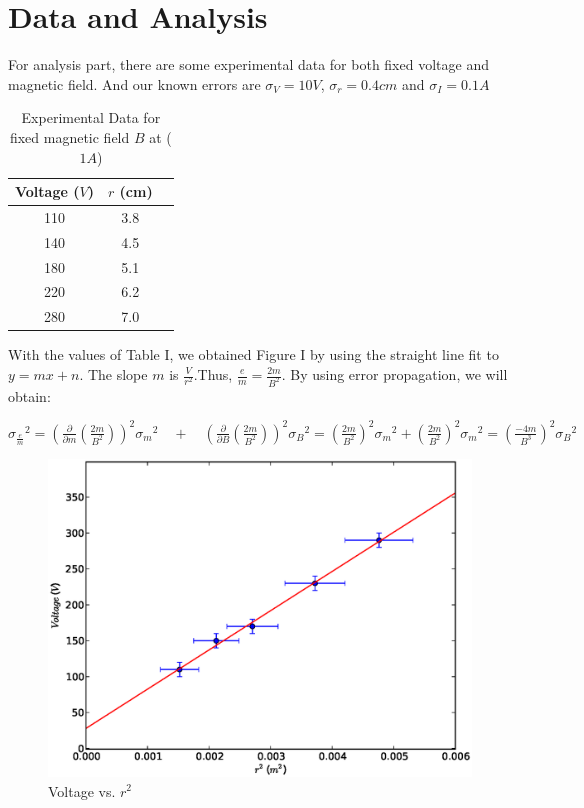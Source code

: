\documentclass[aps,nofootinbib,onecolumn,groupedaddress,a4paper]{revtex4}
\begin{document}
\section{Data and Analysis}
For analysis part, there are some experimental data for both fixed voltage and magnetic field. And our known errors are ${\sigma}_{V}=10V$,  ${\sigma}_{r}=0.4cm$ and ${\sigma}_{I}=0.1A$  
\begin{table}[htdp]
\caption{ Experimental Data for fixed magnetic field $B$ at ($1A$)}
\label{rawdata}
\centering
\begin{tabular}{ccc}
\\
Voltage ($V$)  & $r$ (cm)  \\
\hline
110 &  3.8   \\
140 &  4.5   \\
180 &  5.1   \\
220 &  6.2   \\
280 &  7.0   
\end{tabular}
\label{default}
\end{table}%

With the values of Table I, we obtained Figure I by using the straight line fit to $y=mx+n$. The slope $m$ is $\frac{V}{{r}^{2}}$.Thus, $\frac{e}{m}=\frac{2m}{{B}^{2}}$. By using error propagation, we will obtain:

\begin{center}

${ { \sigma  }_{ \frac { e }{ m }  } }^{ 2 }={ \left( \frac { \partial  }{ \partial m } \left( \frac { 2m }{ { B }^{ 2 } }  \right)  \right)  }^{ 2 }{ { \sigma  }_{ m } }^{ 2 }\quad +\quad { \left( \frac { \partial  }{ \partial B } \left( \frac { 2m }{ { B }^{ 2 } }  \right)  \right)  }^{ 2 }{ { \sigma  }_{ B } }^{ 2 }={ \left( \frac { 2m }{ { B }^{ 2 } }  \right)  }^{ 2 }{ { \sigma  }_{ m } }^{ 2 }+{ \left( \frac { 2m }{ { B }^{ 2 } }  \right)  }^{ 2 }{ { \sigma  }_{ m } }^{ 2 }={ \left( \frac { -4m }{ { B }^{ 3 } }  \right)  }^{ 2 }{ { \sigma  }_{ B } }^{ 2 }$

\end{center}


\begin{figure}[h]
\caption{ Voltage vs. ${r}^{2}$  \label{rawplot}}
\includegraphics[width=0.5 \columnwidth]{fixedb.eps}
\end{figure}
\end{document}
